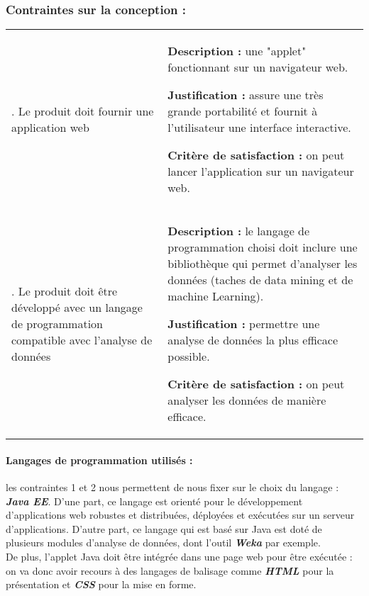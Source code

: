 			\subsubsection{Contraintes sur la conception :}
				\begin{center}\begin{longtable}{|>{\centering}m{3cm}|>{\raggedright\arraybackslash}m{10cm}|}			
				\hline \multicolumn{1}{|c}{\textbf{Contrainte}} & \multicolumn{1}{|c|}{\textbf{Fiche}} \\
				\hline 	1. Le produit doit fournir une application web &
						\begin{description}[style=unboxed,leftmargin=0.2cm]
						\item{\textbf{Description :}} une "applet" fonctionnant sur un navigateur web.
						\item{\textbf{Justification :}} assure une très grande portabilité et fournit à l'utilisateur une interface interactive.
						\item{\textbf{Critère de satisfaction :}} on peut lancer l'application sur un navigateur web.
						\end{description}\\
				\hline 2. Le produit doit être développé avec un langage de programmation compatible avec l'analyse de données &
						\begin{description}[style=unboxed,leftmargin=0.2cm]
						\item{\textbf{Description :}} le langage de programmation choisi doit inclure une bibliothèque qui permet d'analyser les données (taches de data mining et de machine Learning).
						\item{\textbf{Justification :}} permettre une analyse de données la plus efficace possible.
						\item{\textbf{Critère de satisfaction :}} on peut analyser les données de manière efficace.
						\end{description}\\
				\hline
				\end{longtable}\vspace{1em}\end{center}
				
				\paragraph{Langages de programmation utilisés :} les contraintes 1 et 2 nous permettent de nous fixer sur le choix du langage : \textbf{\textit{Java EE}}. D'une part, ce langage est orienté pour le développement d'applications web robustes et distribuées, déployées et exécutées sur un serveur d'applications. D'autre part, ce langage qui est basé sur Java est doté de plusieurs modules d'analyse de données, dont l'outil \textbf{\textit{Weka}} par exemple.\\
				De plus, l'applet Java doit être intégrée dans une page web pour être exécutée : on va donc avoir recours à des langages de balisage comme \textbf{\textit{HTML}} pour la présentation et \textbf{\textit{CSS}} pour la mise en forme.
				
